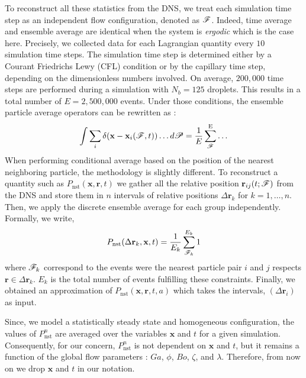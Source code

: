 To reconstruct all these statistics from the DNS, we treat each simulation time step  as an independent flow configuration, denoted as $\mathscr{F}$. 
Indeed, time average and ensemble average are identical when the system is \textit{ergodic} \citep{hansen2013theory} which is the case here.  
Precisely, we collected data for each Lagrangian quantity every $10$ simulation time steps. 
The simulation time step is determined either by a Courant Friedrichs Lewy (CFL) condition or by the capillary time step, depending on the dimensionless numbers involved.
On average, $200,000$ time steps are performed during a simulation with $N_b = 125$ droplets. 
This results in a total number of $E = 2,500,000$ events. 
Under those conditions, the ensemble particle average operators can be rewritten as :
\begin{equation}
    \int \sum_i \delta(\textbf{x}-\textbf{x}_i(\mathscr{F},t)) \ldots d\mathscr{P}
    = \frac{1}{E}\sum_{\mathscr{F}}^\text{E} \ldots 
    \label{eq:discrete_ensemble_average}
\end{equation}  
When performing conditional average based on the position of the nearest neighboring particle, the methodology is slightly different. 
To reconstruct a quantity such as $P_\text{nst}(\textbf{x},\textbf{r},t)$ we gather all the relative position $\textbf{r}_{ij}(t;\mathscr{F})$ from the DNS and store them in $n$ intervals of relative positions $\Delta \textbf{r}_k$ for $k = 1,\ldots, n$.
Then, we apply the discrete ensemble average for each group independently.
Formally, we write, 
\begin{equation}
    P_\text{nst}(\Delta\textbf{r}_k,\textbf{x},t)
    = \frac{1}{E_k} 
    \sum^{E_k}_{\mathscr{F}_k} 
    1
    \label{eq:vec_cond}
\end{equation}
where $\mathscr{F}_k$ correspond to the events were the nearest particle pair $i$ and $j$ respects $\textbf{r} \in \Delta \textbf{r}_k$.
$E_k$ is the total number of events fulfilling these constraints. 
Finally, we obtained an approximation of $P_\text{nst}(\textbf{x},\textbf{r},t,a)$ which takes the intervals, $(\Delta\textbf{r}_i)$ as input.

Since, we model a statistically steady state and homogeneous configuration, the values of $P_\text{nst}^n$ are averaged over the variables $\mathbf{x}$ and $t$ for a given simulation. 
Consequently, for our concern, $P_\text{nst}^n$ is not dependent on $\mathbf{x}$ and $t$, but it remains a function of the global flow parameters :  $Ga$, $\phi$, $Bo$, $\zeta$, and $\lambda$.
Therefore, from now on we drop $\mathbf{x}$ and $t$ in our notation. 